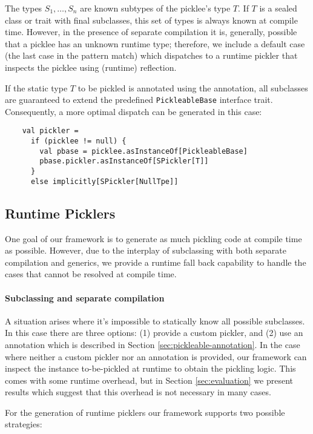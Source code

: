 The types $S_1, \dots, S_n$ are known subtypes of the picklee's type $T$. If $T$
is a sealed class or trait with final subclasses, this set of types is always
known at compile time. However, in the presence of separate compilation it is,
generally, possible that a picklee has an unknown runtime type; therefore, we
include a default case (the last case in the pattern match) which dispatches
to a runtime pickler that inspects the picklee using (runtime) reflection.

If the static type $T$ to be pickled is annotated using the
 annotation, all subclasses are guaranteed to extend the
predefined \verb|PickleableBase| interface trait. Consequently, a more optimal
dispatch can be generated in this case:

\begin{lstlisting}
    val pickler =
      if (picklee != null) {
        val pbase = picklee.asInstanceOf[PickleableBase]
        pbase.pickler.asInstanceOf[SPickler[T]]
      }
      else implicitly[SPickler[NullTpe]]
\end{lstlisting}

\subsection{Runtime Picklers}
\label{sec:runtime-pickler}

One goal of our framework is to generate as much pickling code at compile time
as possible. However, due to the interplay of subclassing with both separate
compilation and generics, we provide a runtime fall back capability to handle
the cases that cannot be resolved at compile time.

\paragraph{Subclassing and separate compilation} A situation arises where it's
impossible to statically know all possible subclasses. In this case there are
three options: (1) provide a custom pickler, and (2) use an annotation which
is described in Section \ref{sec:pickleable-annotation}. In the case where
neither a custom pickler nor an annotation is provided, our framework can
inspect the instance to-be-pickled at runtime to obtain the pickling logic.
This comes with some runtime overhead, but in Section \ref{sec:evaluation} we
present results which suggest that this overhead is not necessary in many
cases.

For the generation of runtime picklers our framework supports two possible
strategies:

